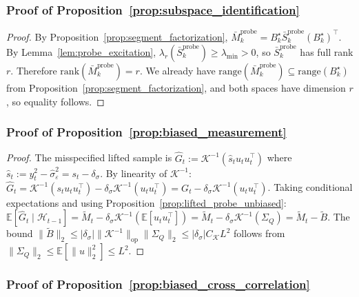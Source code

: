\documentclass{article}
\newcommand{\E}{\mathbb{E}}
\newcommand{\op}{\mathrm{op}}
\newcommand{\cH}{\mathcal{H}}
\newcommand{\rank}{\mathrm{rank}}
\newcommand{\range}{\mathrm{range}}
\begin{document}
\subsubsection{Proof of Proposition~\ref{prop:subspace_identification}}
\label{proof:subspace_identification}

\begin{proof}
By Proposition~\ref{prop:segment_factorization}, $\bar M_k^{\mathrm{probe}} = B_k^\star \bar S_k^{\mathrm{probe}} (B_k^\star)^\top$. By Lemma~\ref{lem:probe_excitation}, $\lambda_r(\bar S_k^{\mathrm{probe}})\ge \lambda_{\min}>0$, so $\bar S_k^{\mathrm{probe}}$ has full rank $r$. Therefore $\rank(\bar M_k^{\mathrm{probe}}) = r$. We already have $\range(\bar M_k^{\mathrm{probe}})\subseteq \range(B_k^\star)$ from Proposition~\ref{prop:segment_factorization}, and both spaces have dimension $r$, so equality follows.
\end{proof}

\subsubsection{Proof of Proposition~\ref{prop:biased_measurement}}
\label{proof:biased_measurement}

\begin{proof}
The misspecified lifted sample is $\hat G_t := \mathcal K^{-1}(\hat s_t u_t u_t^\top)$ where $\hat s_t := y_t^2 - \hat\sigma_\varepsilon^2 = s_t - \delta_\sigma$.
By linearity of $\mathcal K^{-1}$:
$\hat G_t = \mathcal K^{-1}(s_t u_t u_t^\top) - \delta_\sigma \mathcal K^{-1}(u_t u_t^\top) = G_t - \delta_\sigma \mathcal K^{-1}(u_t u_t^\top)$.
Taking conditional expectations and using Proposition~\ref{prop:lifted_probe_unbiased}:
$\E[\hat G_t \mid \cH_{t-1}] = \widetilde M_t - \delta_\sigma \mathcal K^{-1}(\E[u_t u_t^\top]) = \widetilde M_t - \delta_\sigma \mathcal K^{-1}(\Sigma_Q) = \widetilde M_t - \widetilde B$.
The bound $\|\widetilde B\|_2 \le |\delta_\sigma| \|\mathcal K^{-1}\|_{\op} \|\Sigma_Q\|_2 \le |\delta_\sigma| C_{\mathcal K} L^2$ follows from $\|\Sigma_Q\|_2 \le \E[\|u\|_2^2] \le L^2$.
\end{proof}
\subsubsection{Proof of Proposition~\ref{prop:biased_cross_correlation}}
\label{proof:biased_cross_correlation}
\end{document}
